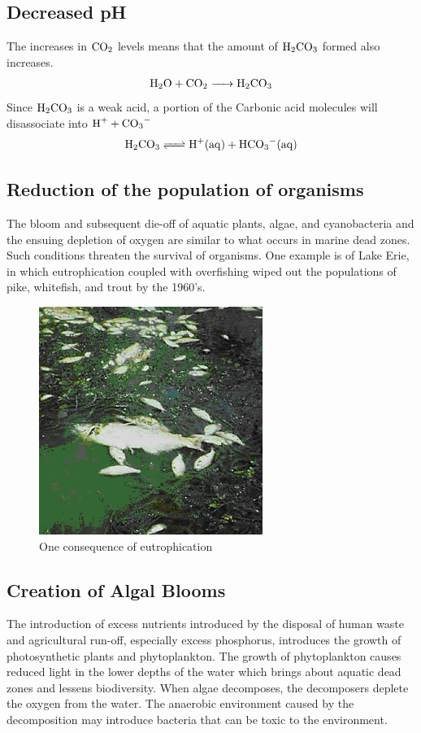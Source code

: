 \documentclass{article}
\begin{document}
    \subsection{Decreased pH}
    The increases in $\ce{CO2}$ levels means that the amount of $\ce{H2CO3}$ formed also increases. 
    \begin{align}
        \ce{H2O + CO2 -> H2CO3}
    \end{align}
    Since $\ce{H2CO3}$ is a weak acid, a portion of the Carbonic acid molecules will disassociate into $\ce{H+ + CO3-}$
    \begin{align}
        \ce{H2CO3 <=> H+(aq) + HCO3-(aq)}
    \end{align}
    \subsection{Reduction of the population of organisms}
    The bloom and subsequent die-off of aquatic plants, algae, and cyanobacteria and the ensuing depletion of oxygen are similar to what occurs in marine dead zones. 
    Such conditions threaten the survival of organisms. One example is of Lake Erie, in which eutrophication coupled with overfishing wiped out the populations of pike, whitefish, and trout by the 1960's\cite{bio}.
        \begin{figure}[h]
            \centering
            \includegraphics{deadfish}
            \caption{One consequence of eutrophication}
            \label{fig:deadfish}
        \end{figure}
    \subsection{Creation of Algal Blooms}
        The introduction of excess nutrients introduced by the disposal of human waste and agricultural run-off, especially excess phosphorus, introduces the growth of photosynthetic plants and phytoplankton. 
        The growth of phytoplankton causes reduced light in the lower depths of the water which brings about aquatic dead zones and lessens biodiversity. When algae decomposes, the decomposers deplete the oxygen from the water. 
        The anaerobic environment caused by the decomposition may introduce bacteria that can be toxic to the environment.\cite{china}
\newpage
\printbibliography[heading=bibintoc]
\end{document}
